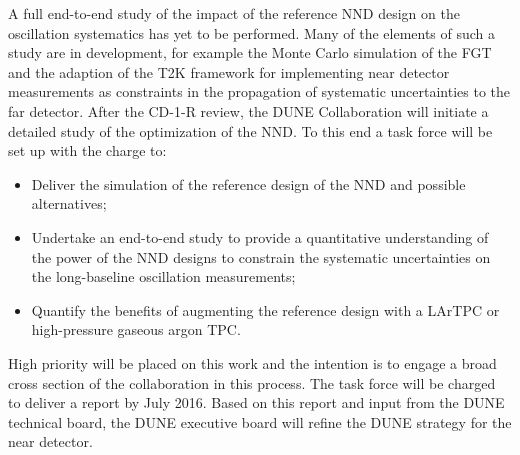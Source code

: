 A full end-to-end study of the impact of the reference NND 
design on the
oscillation systematics has yet to be performed. Many of the elements
of such a study are in development, for example the Monte Carlo
simulation of the FGT and the adaption of the T2K framework for
implementing near detector measurements as constraints in the propagation of
systematic uncertainties to the far detector.  After the CD-1-R review, the DUNE
Collaboration will initiate a detailed study of the optimization of
the NND. 
To this end a task force will be set up with the
charge to:
\begin{itemize}
\item Deliver the simulation of the reference design of the NND and
  possible alternatives;
\item Undertake an end-to-end study to provide a quantitative
  understanding of the power of the NND designs to constrain the
  systematic uncertainties on the long-baseline oscillation measurements;
\item Quantify the benefits of augmenting the reference design with
  a LArTPC or high-pressure gaseous argon TPC.
\end{itemize}
High priority will be placed on this work and the intention is to
engage a broad cross section of the collaboration in this process. The
task force will be charged to deliver a report by July 2016. Based on
this report and input from the DUNE technical board,
the DUNE executive board will refine the DUNE strategy for the near
detector. 
